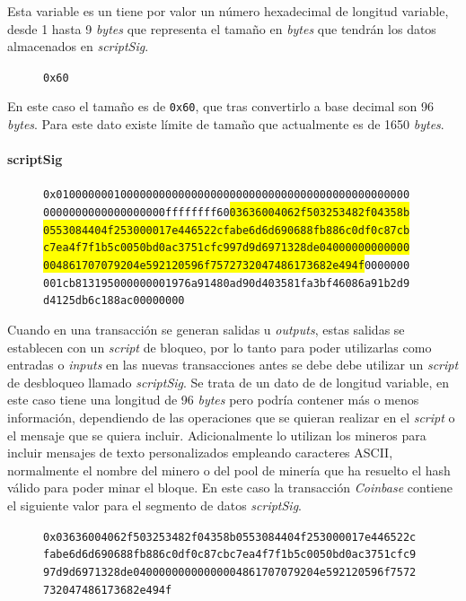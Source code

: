 \documentclass{article}
\begin{document}
    Esta variable es un tiene por valor un número hexadecimal de longitud variable, desde 1 hasta 9 \textit{bytes} que representa el tamaño en \textit{bytes} que tendrán los datos almacenados en \textit{scriptSig}.
    \begin{figure}[H]
        \texttt{0x60}
    \end{figure}
    En este caso el tamaño es de \texttt{0x60}, que tras convertirlo a base decimal son 96 \textit{bytes}. Para este dato existe límite de tamaño que actualmente es de 1650 \textit{bytes}.
    
    \paragraph{scriptSig}
    
    \begin{figure}[H]
        \texttt{0x0100000001000000000000000000000000000000000000000000000} \\
        \texttt{0000000000000000000ffffffff60\colorbox{Yellow}{03636004062f503253482f04358b}} \\
        \texttt{\colorbox{Yellow}{0553084404f253000017e446522cfabe6d6d690688fb886c0df0c87cb}} \\
        \texttt{\colorbox{Yellow}{c7ea4f7f1b5c0050bd0ac3751cfc997d9d6971328de04000000000000}} \\
        \texttt{\colorbox{Yellow}{004861707079204e592120596f7572732047486173682e494f}0000000} \\
        \texttt{001cb813195000000001976a91480ad90d403581fa3bf46086a91b2d9} \\
        \texttt{d4125db6c188ac00000000}
    \end{figure}
    
    Cuando en una transacción se generan salidas u \textit{outputs}, estas salidas se establecen con un \textit{script} de bloqueo, por lo tanto para poder utilizarlas como entradas o \textit{inputs} en las nuevas transacciones antes se debe debe utilizar un \textit{script} de desbloqueo llamado \textit{scriptSig}. Se trata de un dato de de longitud variable, en este caso tiene una longitud de 96 \textit{bytes} pero podría contener más o menos información, dependiendo de las operaciones que se quieran realizar en el \textit{script} o el mensaje que se quiera incluir. Adicionalmente lo utilizan los mineros para incluir mensajes de texto personalizados empleando caracteres ASCII, normalmente el nombre del minero o del pool de minería que ha resuelto el hash válido para poder minar el bloque. En este caso la transacción \textit{Coinbase} contiene el siguiente valor para el segmento de datos \textit{scriptSig}.
    \begin{figure}[H]
        \texttt{0x03636004062f503253482f04358b0553084404f253000017e446522c} \\
        \texttt{fabe6d6d690688fb886c0df0c87cbc7ea4f7f1b5c0050bd0ac3751cfc9}
        \texttt{97d9d6971328de04000000000000004861707079204e592120596f7572}
        \texttt{732047486173682e494f}
        
    \end{figure}
    
\end{document}
